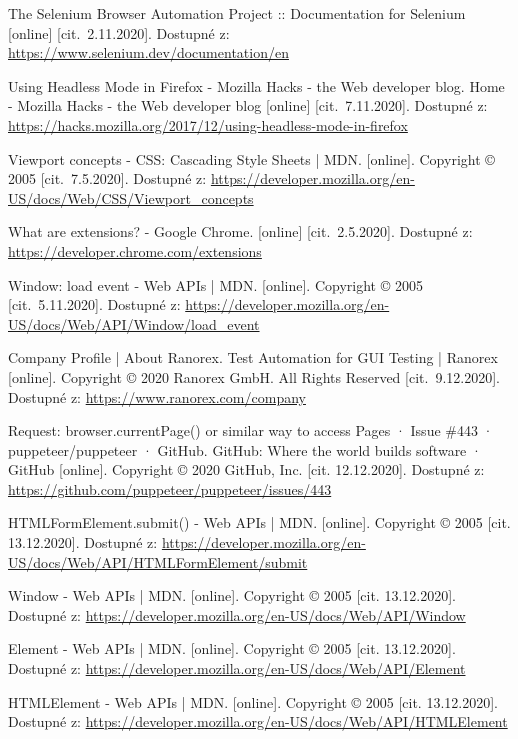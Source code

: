 \begin{thebibliography}{99}
 The Selenium Browser Automation Project :: Documentation for Selenium [online] [cit.~2.11.2020]. Dostupné z: \url{https://www.selenium.dev/documentation/en}

 Using Headless Mode in Firefox - Mozilla Hacks - the Web developer blog. Home - Mozilla Hacks - the Web developer blog [online] [cit.~7.11.2020]. Dostupné z: \url{https://hacks.mozilla.org/2017/12/using-headless-mode-in-firefox}

 Viewport concepts - CSS: Cascading Style Sheets | MDN. [online]. Copyright © 2005 [cit.~7.5.2020]. Dostupné z: \url{https://developer.mozilla.org/en-US/docs/Web/CSS/Viewport_concepts}

 What are extensions? - Google Chrome. [online] [cit.~2.5.2020]. Dostupné z: \url{https://developer.chrome.com/extensions}

 Window: load event - Web APIs | MDN. [online]. Copyright © 2005 [cit.~5.11.2020]. Dostupné z: \url{https://developer.mozilla.org/en-US/docs/Web/API/Window/load_event}

 Company Profile | About Ranorex. Test Automation for GUI Testing | Ranorex [online]. Copyright © 2020 Ranorex GmbH. All Rights Reserved [cit.~9.12.2020]. Dostupné z: \url{https://www.ranorex.com/company}

 Request: browser.currentPage() or similar way to access Pages · Issue \#443 · puppeteer/puppeteer · GitHub. GitHub: Where the world builds software · GitHub [online]. Copyright © 2020 GitHub, Inc. [cit. 12.12.2020]. Dostupné z: \url{https://github.com/puppeteer/puppeteer/issues/443}

 HTMLFormElement.submit() - Web APIs | MDN. [online]. Copyright © 2005 [cit. 13.12.2020]. Dostupné z: \url{https://developer.mozilla.org/en-US/docs/Web/API/HTMLFormElement/submit}

 Window - Web APIs | MDN. [online]. Copyright © 2005 [cit. 13.12.2020]. Dostupné z: \url{https://developer.mozilla.org/en-US/docs/Web/API/Window}

 Element - Web APIs | MDN. [online]. Copyright © 2005 [cit. 13.12.2020]. Dostupné z: \url{https://developer.mozilla.org/en-US/docs/Web/API/Element}

 HTMLElement - Web APIs | MDN. [online]. Copyright © 2005 [cit. 13.12.2020]. Dostupné z: \url{https://developer.mozilla.org/en-US/docs/Web/API/HTMLElement}


\end{thebibliography}
